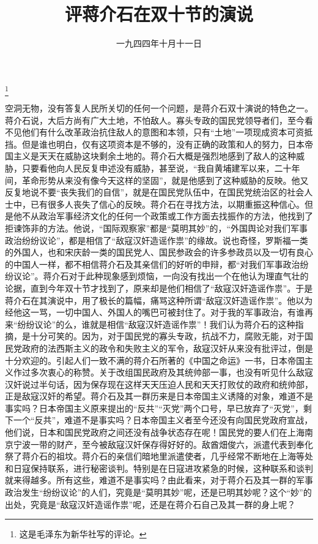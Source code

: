 
\title{评蒋介石在双十节的演说}
\date{一九四四年十月十一日}
\thanks{这是毛泽东为新华社写的评论。}
\maketitle


空洞无物，没有答复人民所关切的任何一个问题，是蒋介石双十演说的特色之一。蒋介石说，大后方尚有广大土地，不怕敌人。寡头专政的国民党领导者们，至今看不见他们有什么改革政治抗住敌人的意图和本领，只有“土地”一项现成资本可资抵挡。但是谁也明白，仅有这项资本是不够的，没有正确的政策和人的努力，日本帝国主义是天天在威胁这块剩余土地的。蒋介石大概是强烈地感到了敌人的这种威胁，只要看他向人民反复申述没有威胁，甚至说，“我自黄埔建军以来，二十年间，革命形势从来没有像今天这样的坚固”，就是他感到了这种威胁的反映。他又反复地说不要“丧失我们的自信”，就是在国民党队伍中，在国民党统治区的社会人士中，已有很多人丧失了信心的反映。蒋介石在寻找方法，以期重振这种信心。但是他不从政治军事经济文化的任何一个政策或工作方面去找振作的方法，他找到了拒谏饰非的方法。他说，“国际观察家”都是“莫明其妙”的，“外国舆论对我们军事政治纷纷议论”，都是相信了“敌寇汉奸造谣作祟”的缘故。说也奇怪，罗斯福一类的外国人，也和宋庆龄一类的国民党人、国民参政会的许多参政员以及一切有良心的中国人一样，都不相信蒋介石及其亲信们的好听的申辩，都“对我们军事政治纷纷议论”。蒋介石对于此种现象感到烦恼，一向没有找出一个在他认为理直气壮的论据，直到今年双十节才找到了，原来却是他们相信了“敌寇汉奸造谣作祟”。于是蒋介石在其演说中，用了极长的篇幅，痛骂这种所谓“敌寇汉奸造谣作祟”。他以为经他这一骂，一切中国人、外国人的嘴巴可被封住了。对于我的军事政治，有谁再来“纷纷议论”的么，谁就是相信“敌寇汉奸造谣作祟”！我们认为蒋介石的这种指摘，是十分可笑的。因为，对于国民党的寡头专政，抗战不力，腐败无能，对于国民党政府的法西斯主义的政令和失败主义的军令，敌寇汉奸从来没有批评过，倒是十分欢迎的。引起人们一致不满的蒋介石所著的《中国之命运》一书，日本帝国主义作过多次衷心的称赞。关于改组国民政府及其统帅部一事，也没有听见什么敌寇汉奸说过半句话，因为保存现在这样天天压迫人民和天天打败仗的政府和统帅部，正是敌寇汉奸的希望。蒋介石及其一群历来是日本帝国主义诱降的对象，难道不是事实吗？日本帝国主义原来提出的“反共”“灭党”两个口号，早已放弃了“灭党”，剩下一个“反共”，难道不是事实吗？日本帝国主义者至今还没有向国民党政府宣战，他们说，日本和国民党政府之间还没有战争状态存在呢！国民党的要人们在上海南京宁波一带的财产，至今被敌寇汉奸保存得好好的。敌酋畑俊六，派遣代表到奉化祭了蒋介石的祖坟。蒋介石的亲信们暗地里派遣使者，几乎经常不断地在上海等处和日寇保持联系，进行秘密谈判。特别是在日寇进攻紧急的时候，这种联系和谈判就来得越多。所有这些，难道不是事实吗？由此看来，对于蒋介石及其一群的军事政治发生“纷纷议论”的人们，究竟是“莫明其妙”呢，还是已明其妙呢？这个“妙”的出处，究竟是“敌寇汉奸造谣作祟”呢，还是在蒋介石自己及其一群的身上呢？

